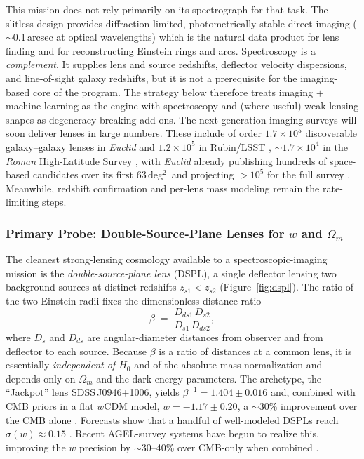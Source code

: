 \documentclass[10pt,onecolumn]{article}
\newcommand{\degti}{deg$^2$}
\begin{document}
This mission does not rely primarily on its spectrograph for that task. The slitless design provides diffraction-limited, photometrically stable direct imaging ($\sim$0.1\,arcsec at optical wavelengths) which is the natural data product for lens finding and for reconstructing Einstein rings and arcs. Spectroscopy is a \emph{complement}. It supplies lens and source redshifts, deflector velocity dispersions, and line-of-sight galaxy redshifts, but it is not a prerequisite for the imaging-based core of the program. The strategy below therefore treats imaging $+$ machine learning as the engine with spectroscopy and (where useful) weak-lensing shapes as degeneracy-breaking add-ons. The next-generation imaging surveys will soon deliver lenses in large numbers. These include of order $1.7\times10^5$ discoverable galaxy--galaxy lenses in \textit{Euclid} and $1.2\times10^5$ in Rubin/LSST \cite{collett2015}, $\sim$$1.7\times10^4$ in the \textit{Roman} High-Latitude Survey \cite{weiner2020}, with \textit{Euclid} already publishing hundreds of space-based candidates over its first 63\,\degti\ and projecting $>10^5$ for the full survey \cite{walmsley2025}. Meanwhile, redshift confirmation \cite{shu2025} and per-lens mass modeling remain the rate-limiting steps.

\subsubsection{Primary Probe: Double-Source-Plane Lenses for \texorpdfstring{$w$}{w} and \texorpdfstring{$\Omega_m$}{Omega_m}}

The cleanest strong-lensing cosmology available to a spectroscopic-imaging mission is the \emph{double-source-plane lens} (DSPL), a single deflector lensing two background sources at distinct redshifts $z_{s1}<z_{s2}$ (Figure~\ref{fig:dspl}). The ratio of the two Einstein radii fixes the dimensionless distance ratio
\begin{equation}
\beta \;=\; \frac{D_{ds1}\,D_{s2}}{D_{s1}\,D_{ds2}},
\label{eq:dsplbeta}
\end{equation}
where $D_{s}$ and $D_{ds}$ are angular-diameter distances from observer and from deflector to each source. Because $\beta$ is a ratio of distances at a common lens, it is essentially \emph{independent of $H_0$} and of the absolute mass normalization and depends only on $\Omega_m$ and the dark-energy parameters. The archetype, the ``Jackpot'' lens SDSS\,J0946$+$1006, yields $\beta^{-1}=1.404\pm0.016$ and, combined with CMB priors in a flat $w$CDM model, $w=-1.17\pm0.20$, a $\sim$30\% improvement over the CMB alone \cite{collettauger2014}. Forecasts show that a handful of well-modeled DSPLs reach $\sigma(w)\approx0.15$ \cite{collett2012}. Recent AGEL-survey systems have begun to realize this, improving the $w$ precision by $\sim$30--40\% over CMB-only when combined \cite{sahu2025,bowden2025}.
\end{document}
